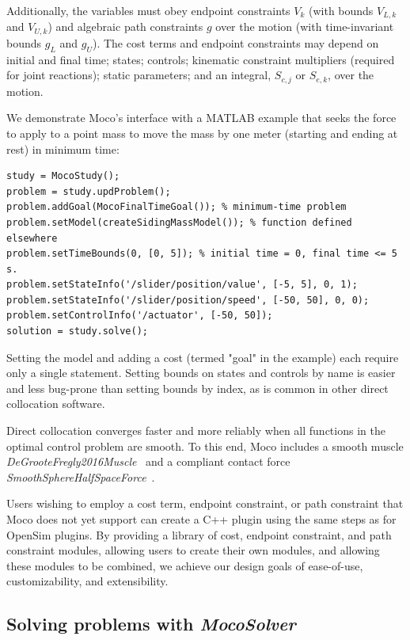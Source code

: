 \documentclass[10pt,letterpaper]{article}
\begin{document}
Additionally, the variables must obey endpoint constraints $V_k$ (with bounds $V_{L,k}$ and $V_{U,k}$) and algebraic path constraints $g$ over the motion (with time-invariant bounds $g_L$ and $g_U$). The cost terms and endpoint constraints may depend on initial and final time; states; controls; kinematic constraint multipliers (required for joint reactions); static parameters; and an integral, $S_{c,j}$ or $S_{e,k}$, over the motion.

We demonstrate Moco's interface with a MATLAB
example that seeks the force to apply to a point mass to move the mass by one meter (starting and ending at rest) in minimum time:
\begin{lstlisting}
study = MocoStudy();
problem = study.updProblem();
problem.addGoal(MocoFinalTimeGoal()); % minimum-time problem
problem.setModel(createSidingMassModel()); % function defined elsewhere
problem.setTimeBounds(0, [0, 5]); % initial time = 0, final time <= 5 s.
problem.setStateInfo('/slider/position/value', [-5, 5], 0, 1);
problem.setStateInfo('/slider/position/speed', [-50, 50], 0, 0);
problem.setControlInfo('/actuator', [-50, 50]);
solution = study.solve();
\end{lstlisting}
Setting the model and adding a cost (termed "goal" in the example) each
require only a single statement. Setting bounds on states and controls by name is easier and less bug-prone than setting bounds by index, as is common in other direct collocation software.

Direct collocation converges faster and more reliably when all functions in the optimal control problem are smooth. To this end, Moco includes a smooth muscle \textit{DeGrooteFregly2016Muscle}~\cite{Groote:2016dq} and a compliant contact force \textit{SmoothSphereHalfSpaceForce}~\cite{Serrancoli:2019aa}.

Users wishing to employ a cost term, endpoint constraint, or path constraint that Moco does not yet support can create a C++ plugin using the same steps as for OpenSim plugins. By providing a library of cost, endpoint constraint, and path constraint modules, allowing users to create their own modules, and allowing these modules to be combined, we achieve our design goals of ease-of-use, customizability, and extensibility.


\subsection*{Solving problems with \textit{MocoSolver}}
\end{document}
